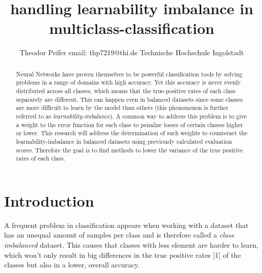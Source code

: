 \documentclass[journal]{IEEEtran}
\begin{document}
\title{\textbf{handling learnability imbalance in multiclass-classification}}



\author{Theodor Peifer
        \linebreak
        email: thp7219@thi.de
        \linebreak
        Technische Hochschule Ingolstadt
}



\maketitle


\begin{abstract}
Neural Networks have proven themselves to be powerful classification
tools by solving problems in a range of domains with high accuracy.
Yet this accuracy is never evenly distributed across all classes, which means that the true-positive rates of each class separately are different.
This can happen even in balanced datasets since some classes are more difficult to learn by the model than others (this phenomenon is further referred to as \emph{learnability-imbalance}).
A common way to address this problem is to give a weight to the error function for each class to penalize losses of certain classes higher or lower.
This research will address the determination of such weights to counteract the learnability-imbalance in balanced datasets using previously calculated evaluation scores.
Therefore the goal is to find methods to lower the variance of the true positive rates of each class.
\end{abstract}


\section{Introduction}
A frequent problem in classification appears when working with a dataset that has an unequal amount of samples per class and is therefore called a \emph{class imbalanced} dataset.
This causes that classes with less element are harder to learn, which won't only result in big differences in the true positive rates [1] of the classes but also in a lower, overall accuracy.
\end{document}

